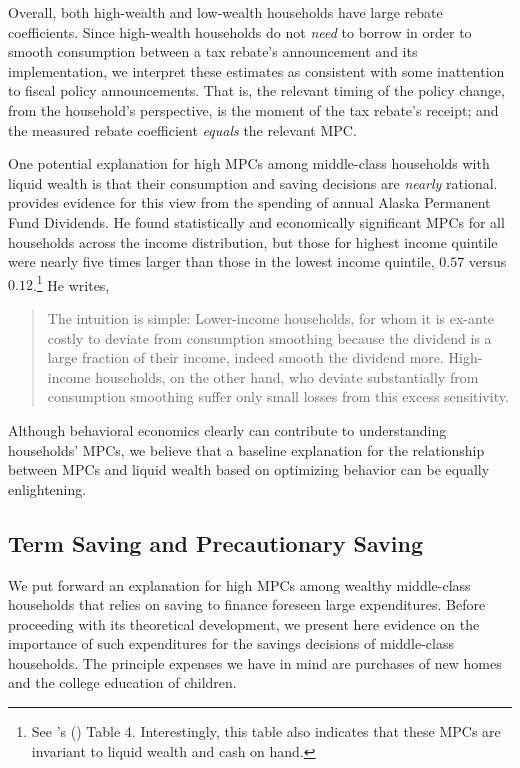 \documentclass[fleqccn,12pt]{article}
\newcommand{\cites}[1]{\citeauthor{#1}'s (\citeyear{#1})}
\begin{document}
Overall, both high-wealth and low-wealth households have large rebate coefficients. Since high-wealth households do not \emph{need} to borrow in order to smooth consumption between a tax rebate's announcement and its implementation, we interpret these estimates as consistent with some inattention to fiscal policy announcements.  That is, the relevant timing of the policy change, from the household's perspective, is the moment of the tax rebate's receipt; and the measured rebate coefficient \emph{equals} the relevant MPC. 

One potential explanation for high MPCs among middle-class households with liquid wealth is that their consumption and saving decisions are \emph{nearly} rational. \cite{qje2018Kueng} provides evidence for this view from the spending of annual Alaska Permanent Fund Dividends. He found statistically and economically significant MPCs for all households across the income distribution, but those for highest income quintile were nearly five times larger than those in the lowest income quintile, $0.57$ versus $0.12$.\footnote{See \cites{qje2018Kueng} Table 4. Interestingly, this table also indicates that these MPCs are invariant to liquid wealth and cash on hand.} He writes,
\begin{quote}
The intuition is simple: Lower-income households, for whom it is ex-ante costly to deviate from consumption smoothing because the dividend is a large fraction of their income, indeed smooth the dividend more. High-income households, on the other hand, who deviate substantially from consumption smoothing suffer only small losses from this excess sensitivity.
\end{quote}
Although behavioral economics clearly can contribute to understanding households' MPCs, we believe that a baseline explanation for the relationship between MPCs and liquid wealth based on optimizing behavior can be equally enlightening.

\subsection{Term Saving and Precautionary Saving}

We put forward an explanation for high MPCs among wealthy middle-class households that relies on saving to finance foreseen large expenditures. Before proceeding with its theoretical development, we present here evidence on the importance of such expenditures for the savings decisions of middle-class households. The principle expenses we have in mind are purchases of new homes and the college education of children. 
\end{document}
